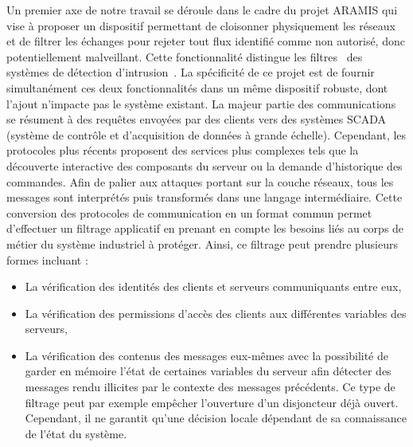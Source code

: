 \documentclass{article}
\newcommand{\aramis}{ARAMIS\xspace}
\begin{document}
Un premier axe de notre travail se déroule dans le cadre du projet \aramis{}
\cite{aramis} qui vise à proposer un dispositif permettant de cloisonner
physiquement les réseaux et de filtrer les échanges pour rejeter tout flux
identifié comme non autorisé, donc potentiellement malveillant.
Cette fonctionnalité distingue les filtres~\cite{DESIRE10,StoneGate11,rWeb13,
DZNetwork14} des systèmes de détection d'intrusion~\cite{StoneGate13,Pax99,
Suricata,Snort}.
La spécificité de ce projet est de fournir simultanément ces deux
fonctionnalités dans un même dispositif robuste, dont l'ajout n'impacte pas le
système existant.
La majeur partie des communications se résument à des requêtes envoyées par des
clients vers des systèmes SCADA (système de contrôle et d'acquisition de données
à grande échelle).
Cependant, les protocoles plus récents proposent des services plus complexes
tels que la découverte interactive des composants du serveur ou la demande
d'historique des commandes.
Afin de palier aux attaques portant sur la couche réseaux, tous les messages
sont interprétés puis transformés dans une langage intermédiaire.
Cette conversion des protocoles de communication en un format commun permet
d'effectuer un filtrage applicatif en prenant en compte les besoins liés au
corps de métier du système industriel à protéger.
Ainsi, ce filtrage peut prendre plusieurs formes incluant :
\begin{itemize}
    \item La vérification des identités des clients et serveurs communiquants
        entre eux,
    \item La vérification des permissions d'accès des clients aux différentes
        variables des serveurs,
    \item La vérification des contenus des messages eux-mêmes avec la
        possibilité de garder en mémoire l'état de certaines variables du
        serveur afin détecter des messages rendu illicites par le contexte des
        messages précédents.
        Ce type de filtrage peut par exemple empêcher l'ouverture d'un
        disjoncteur déjà ouvert.
        Cependant, il ne garantit qu'une décision locale dépendant de sa
        connaissance de l'état du système.
\end{itemize}

\end{document}
